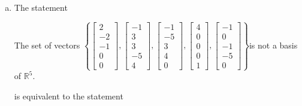 \begin{exerciseAnswer}
\begin{enumerate}[(a)]
\item The statement 
\begin{center}\begin{minipage}{0.8\textwidth}
 The set of vectors \( \left\{ \left[\begin{array}{c}
2 \\
-2 \\
-1 \\
0 \\
0
\end{array}\right] , \left[\begin{array}{c}
-1 \\
3 \\
3 \\
-5 \\
4
\end{array}\right] , \left[\begin{array}{c}
-1 \\
-5 \\
3 \\
4 \\
0
\end{array}\right] , \left[\begin{array}{c}
4 \\
0 \\
0 \\
0 \\
1
\end{array}\right] , \left[\begin{array}{c}
-1 \\
0 \\
-1 \\
-5 \\
0
\end{array}\right] \right\} \)is not a basis of \(\mathbb{R}^5\). 
\end{minipage}\end{center}
     is equivalent to the statement 
\begin{center}\begin{minipage}{0.8\textwidth}
 The set of vectors \( \left\{ \left[\begin{array}{c}
2 \\
-2 \\
-1 \\
0 \\
0
\end{array}\right] , \left[\begin{array}{c}
-1 \\
3 \\

\end{array}
\end{minipage}
\end{center}
\end{enumerate}
\end{exerciseAnswer}
